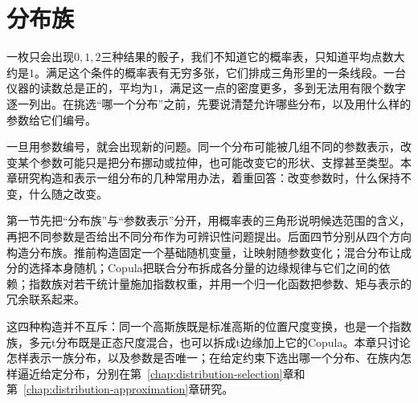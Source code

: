\chapter{分布族}
\label{chap:distribution-families}

一枚只会出现$0,1,2$三种结果的骰子，我们不知道它的概率表，只知道平均点数大约是$1$。满足这个条件的概率表有无穷多张，它们排成三角形里的一条线段。一台仪器的读数总是正的，平均为$1$，满足这一点的密度更多，多到无法用有限个数字逐一列出。在挑选“哪一个分布”之前，先要说清楚允许哪些分布，以及用什么样的参数给它们编号。

一旦用参数编号，就会出现新的问题。同一个分布可能被几组不同的参数表示，改变某个参数可能只是把分布挪动或拉伸，也可能改变它的形状、支撑甚至类型。本章研究构造和表示一组分布的几种常用办法，着重回答：改变参数时，什么保持不变，什么随之改变。

第一节先把“分布族”与“参数表示”分开，用概率表的三角形说明候选范围的含义，再把不同参数是否给出不同分布作为可辨识性问题提出。后面四节分别从四个方向构造分布族。推前构造固定一个基础随机变量，让映射随参数变化；混合分布让成分的选择本身随机；Copula把联合分布拆成各分量的边缘规律与它们之间的依赖；指数族对若干统计量施加指数权重，并用一个归一化函数把参数、矩与表示的冗余联系起来。

这四种构造并不互斥：同一个高斯族既是标准高斯的位置尺度变换，也是一个指数族，多元t分布既是正态尺度混合，也可以拆成t边缘加上它的Copula。本章只讨论怎样表示一族分布，以及参数是否唯一；在给定约束下选出哪一个分布、在族内怎样逼近给定分布，分别在第~\ref{chap:distribution-selection}章和第~\ref{chap:distribution-approximation}章研究。












